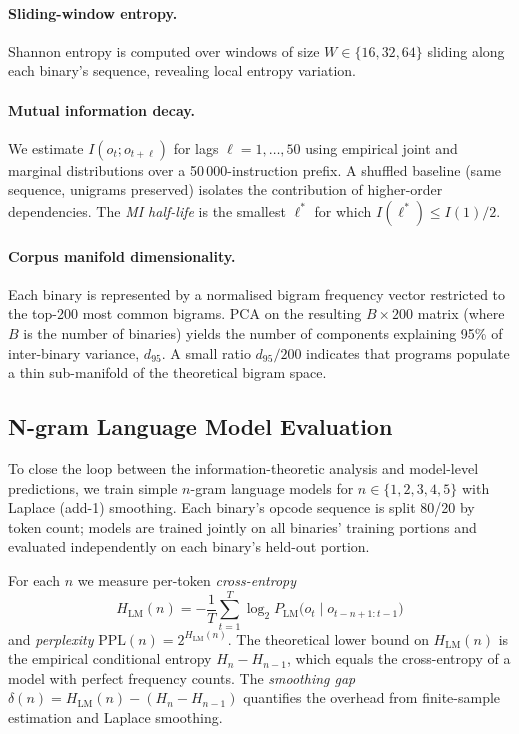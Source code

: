 \documentclass[10pt,twocolumn]{article}
\begin{document}
\paragraph{Sliding-window entropy.}
Shannon entropy is computed over windows of size $W \in \{16, 32, 64\}$
sliding along each binary's sequence, revealing local entropy variation.

\paragraph{Mutual information decay.}
We estimate $I(o_t; o_{t+\ell})$ for lags $\ell = 1, \ldots, 50$ using
empirical joint and marginal distributions over a 50\,000-instruction prefix.
A shuffled baseline (same sequence, unigrams preserved) isolates the
contribution of higher-order dependencies.  The \emph{MI half-life} is the
smallest $\ell^*$ for which $I(\ell^*) \leq I(1)/2$.

\paragraph{Corpus manifold dimensionality.}
Each binary is represented by a normalised bigram frequency vector restricted
to the top-200 most common bigrams.  PCA on the resulting $B \times 200$ matrix
(where $B$ is the number of binaries) yields the number of components
explaining 95\% of inter-binary variance, $d_{95}$.  A small ratio
$d_{95}/200$ indicates that programs populate a thin sub-manifold of the
theoretical bigram space.

\subsection{N-gram Language Model Evaluation}
\label{sec:lm_method}

To close the loop between the information-theoretic analysis and model-level
predictions, we train simple $n$-gram language models for $n \in \{1,2,3,4,5\}$
with Laplace (add-1) smoothing.  Each binary's opcode sequence is split 80/20
by token count; models are trained jointly on all binaries' training portions
and evaluated independently on each binary's held-out portion.

For each $n$ we measure per-token \emph{cross-entropy}
\begin{equation}
  H_{\mathrm{LM}}(n) = -\frac{1}{T}\sum_{t=1}^{T}
        \log_2 P_{\mathrm{LM}}\!\bigl(o_t \mid o_{t-n+1:t-1}\bigr)
  \label{eq:lmce}
\end{equation}
and \emph{perplexity} $\mathrm{PPL}(n) = 2^{H_{\mathrm{LM}}(n)}$.  The
theoretical lower bound on $H_{\mathrm{LM}}(n)$ is the empirical conditional
entropy $H_n - H_{n-1}$, which equals the cross-entropy of a model with
perfect frequency counts.  The \emph{smoothing gap}
$\delta(n) = H_{\mathrm{LM}}(n) - (H_n - H_{n-1})$ quantifies the overhead
from finite-sample estimation and Laplace smoothing.
\end{document}
